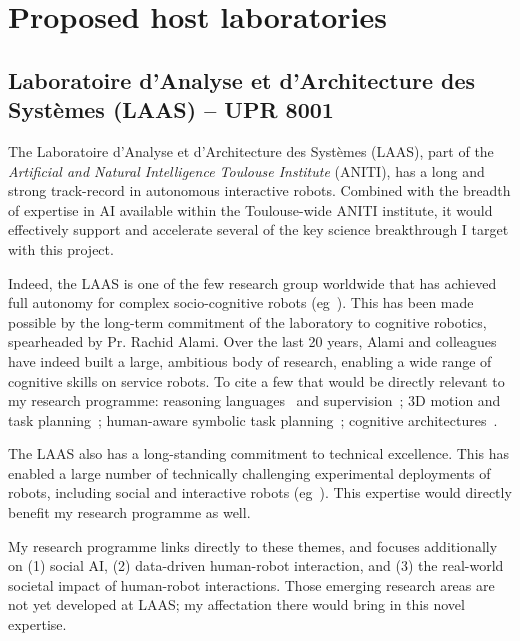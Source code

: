 \section{Proposed host laboratories}

\subsection{Laboratoire d'Analyse et d'Architecture des Systèmes (LAAS) -- UPR 8001}

The Laboratoire d'Analyse et d'Architecture des Systèmes (LAAS), part of the
\emph{Artificial and Natural Intelligence Toulouse Institute} (ANITI), has a
long and strong track-record in autonomous interactive robots. Combined with the
breadth of expertise in AI available within the Toulouse-wide ANITI institute,
it would effectively support and accelerate several of the key science
breakthrough I target with this project.

Indeed, the LAAS is one of the few research group worldwide that has achieved
full autonomy for complex socio-cognitive robots
(eg~\cite{lemaignan2017artificial}).  This has been made possible by the
long-term commitment of the laboratory to cognitive robotics, spearheaded by Pr.
Rachid Alami. Over the last 20 years, Alami and colleagues have indeed built a
large, ambitious body of research, enabling a wide range of cognitive skills on
service robots. To cite a few that would be directly relevant to my research
programme: reasoning languages~\autocite{Ingrand1996} and
supervision~\autocite{Clodic2009}; 3D motion and task
planning~\autocite{Sisbot2008, Mainprice2011}; human-aware symbolic task
planning~\autocite{alami2005task,Alili2008,Lallement2014,milliez2016using};
cognitive architectures~\autocite{devin2016implemented}.

The LAAS also has a long-standing commitment to technical excellence. This has
enabled a large number of technically challenging experimental deployments of
robots, including social and interactive robots (eg~\textcite{alami2005task}).
This expertise would directly benefit my research programme as well.

My research programme links directly to these themes, and focuses additionally
on (1) social AI, (2) data-driven human-robot interaction, and (3) the
real-world societal impact of human-robot interactions. Those emerging research
areas are not yet developed at LAAS; my affectation there would bring in this novel
expertise.

